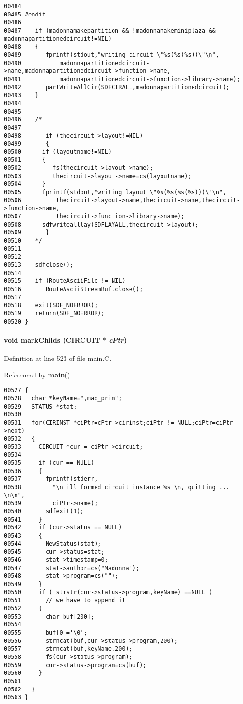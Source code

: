\begin{verbatim}
00484    
00485 #endif
00486    
00487    if (madonnamakepartition && !madonnamakeminiplaza && madonnapartitionedcircuit!=NIL)
00488    {
00489       fprintf(stdout,"writing circuit \"%s(%s(%s))\"\n",
00490           madonnapartitionedcircuit->name,madonnapartitionedcircuit->function->name,
00491           madonnapartitionedcircuit->function->library->name);
00492       partWriteAllCir(SDFCIRALL,madonnapartitionedcircuit);
00493    }
00494    
00495    
00496    /*
00497       
00498       if (thecircuit->layout!=NIL)
00499       {
00500      if (layoutname!=NIL)
00501      {
00502         fs(thecircuit->layout->name);
00503         thecircuit->layout->name=cs(layoutname);
00504      }
00505      fprintf(stdout,"writing layout \"%s(%s(%s(%s)))\"\n",
00506          thecircuit->layout->name,thecircuit->name,thecircuit->function->name,
00507          thecircuit->function->library->name);
00508      sdfwritealllay(SDFLAYALL,thecircuit->layout);
00509       }
00510    */
00511    
00512    
00513    sdfclose();
00514 
00515    if (RouteAsciiFile != NIL)
00516       RouteAsciiStreamBuf.close();
00517      
00518    exit(SDF_NOERROR);
00519    return(SDF_NOERROR);
00520 }
\end{verbatim}\normalsize 
\label{main.C_a8}
\paragraph{\setlength{\rightskip}{0pt plus 5cm}void mark\-Childs (CIRCUIT $\ast$ {\em c\-Ptr})}\hfill



Definition at line 523 of file main.C.

Referenced by {\bf main}().\small\begin{verbatim}00527 {
00528   char *keyName=",mad_prim";
00529   STATUS *stat;
00530 
00531   for(CIRINST *ciPtr=cPtr->cirinst;ciPtr != NULL;ciPtr=ciPtr->next)
00532   {
00533     CIRCUIT *cur = ciPtr->circuit;
00534 
00535     if (cur == NULL)
00536     {
00537       fprintf(stderr,
00538         "\n ill formed circuit instance %s \n, quitting ... \n\n",
00539         ciPtr->name);
00540       sdfexit(1);
00541     }
00542     if (cur->status == NULL)
00543     {
00544       NewStatus(stat);
00545       cur->status=stat;
00546       stat->timestamp=0;
00547       stat->author=cs("Madonna");
00548       stat->program=cs("");
00549     }
00550     if ( strstr(cur->status->program,keyName) ==NULL )
00551       // we have to append it
00552     {
00553       char buf[200];
00554 
00555       buf[0]='\0';
00556       strncat(buf,cur->status->program,200);
00557       strncat(buf,keyName,200);
00558       fs(cur->status->program);
00559       cur->status->program=cs(buf);
00560     }
00561 
00562   }
00563 }
\end{verbatim}\normalsize 
\label{main.C_a9}
